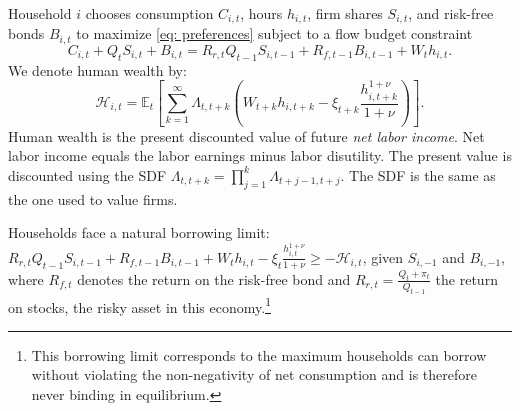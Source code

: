 Household $i$ chooses consumption $C_{i,t}$, hours $h_{i,t}$, firm shares $S_{i,t}$, and risk-free bonds $B_{i,t}$ to maximize \eqref{eq: preferences} subject to a flow budget constraint
\begin{equation}\label{eq: flow_bc}
    C_{i,t} + Q_t S_{i,t} + B_{i,t} = R_{r,t} Q_{t-1} S_{i,t-1} + R_{f,t-1} B_{i,t-1} + W_t h_{i,t}.
\end{equation}
We denote human wealth by:
\begin{equation}\label{eq: human_wealth}
   \mathcal{H}_{i,t} = \mathbb{E}_t\left[ \sum_{k=1}^\infty \Lambda_{t,t+k} \left( W_{t+k} h_{i,t+k}- \xi_{t+k} \frac{h_{i,t+k}^{1+\nu}}{1+\nu}  \right) \right].
\end{equation}
Human wealth is the present discounted value of future \textit{net labor income}. 
Net labor income equals the labor earnings minus labor disutility. The present value is discounted using the SDF $\Lambda_{t,t+k} = \prod_{j=1}^k \Lambda_{t+j-1,t+j}$. 
The SDF is the same as the one used to value firms. 

Households face a natural borrowing limit: $R_{r,t}Q_{t-1} S_{i,t-1} + R_{f,t-1} B_{i,t-1} + W_t h_{i,t}- \xi_t \frac{h_{i,t}^{1+\nu}}{1+\nu} \geq -\mathcal{H}_{i,t}$, given $S_{i,-1}$ and $B_{i,-1}$, where $R_{f,t}$ denotes the return on the risk-free bond and $R_{r,t} = \frac{Q_t + \pi_t}{Q_{t-1}}$ the return on stocks, the risky asset in this economy.\footnote{This borrowing limit corresponds to the maximum households can borrow without violating the non-negativity of net consumption and is therefore never binding in equilibrium.}

